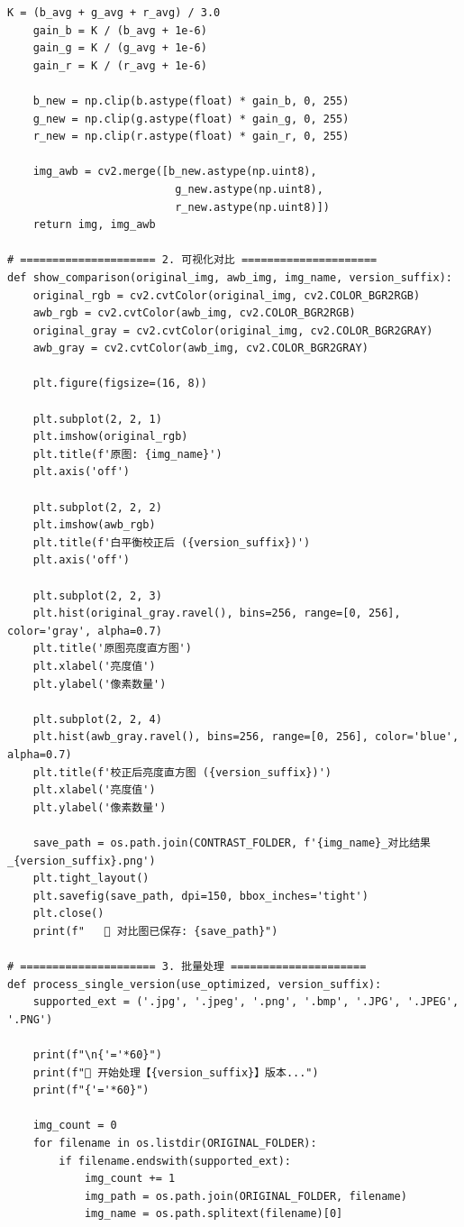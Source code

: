 \documentclass[12pt,a4paper,UTF8]{ctexart} %
\begin{document}
\begin{lstlisting}[caption={完整的自动白平衡Demo代码（awb\_demo_v2.py）}, label=code:full]
    K = (b_avg + g_avg + r_avg) / 3.0
    gain_b = K / (b_avg + 1e-6)
    gain_g = K / (g_avg + 1e-6)
    gain_r = K / (r_avg + 1e-6)
    
    b_new = np.clip(b.astype(float) * gain_b, 0, 255)
    g_new = np.clip(g.astype(float) * gain_g, 0, 255)
    r_new = np.clip(r.astype(float) * gain_r, 0, 255)
    
    img_awb = cv2.merge([b_new.astype(np.uint8), 
                          g_new.astype(np.uint8), 
                          r_new.astype(np.uint8)])
    return img, img_awb

# ===================== 2. 可视化对比 =====================
def show_comparison(original_img, awb_img, img_name, version_suffix):
    original_rgb = cv2.cvtColor(original_img, cv2.COLOR_BGR2RGB)
    awb_rgb = cv2.cvtColor(awb_img, cv2.COLOR_BGR2RGB)
    original_gray = cv2.cvtColor(original_img, cv2.COLOR_BGR2GRAY)
    awb_gray = cv2.cvtColor(awb_img, cv2.COLOR_BGR2GRAY)
    
    plt.figure(figsize=(16, 8))
    
    plt.subplot(2, 2, 1)
    plt.imshow(original_rgb)
    plt.title(f'原图: {img_name}')
    plt.axis('off')
    
    plt.subplot(2, 2, 2)
    plt.imshow(awb_rgb)
    plt.title(f'白平衡校正后 ({version_suffix})')
    plt.axis('off')
    
    plt.subplot(2, 2, 3)
    plt.hist(original_gray.ravel(), bins=256, range=[0, 256], color='gray', alpha=0.7)
    plt.title('原图亮度直方图')
    plt.xlabel('亮度值')
    plt.ylabel('像素数量')
    
    plt.subplot(2, 2, 4)
    plt.hist(awb_gray.ravel(), bins=256, range=[0, 256], color='blue', alpha=0.7)
    plt.title(f'校正后亮度直方图 ({version_suffix})')
    plt.xlabel('亮度值')
    plt.ylabel('像素数量')
    
    save_path = os.path.join(CONTRAST_FOLDER, f'{img_name}_对比结果_{version_suffix}.png')
    plt.tight_layout()
    plt.savefig(save_path, dpi=150, bbox_inches='tight')
    plt.close()
    print(f"   💾 对比图已保存: {save_path}")

# ===================== 3. 批量处理 =====================
def process_single_version(use_optimized, version_suffix):
    supported_ext = ('.jpg', '.jpeg', '.png', '.bmp', '.JPG', '.JPEG', '.PNG')
    
    print(f"\n{'='*60}")
    print(f"🚀 开始处理【{version_suffix}】版本...")
    print(f"{'='*60}")
    
    img_count = 0
    for filename in os.listdir(ORIGINAL_FOLDER):
        if filename.endswith(supported_ext):
            img_count += 1
            img_path = os.path.join(ORIGINAL_FOLDER, filename)
            img_name = os.path.splitext(filename)[0]
            

\end{lstlisting}
\end{document}
